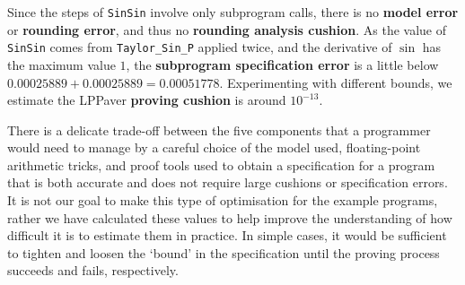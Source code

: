 \documentclass[runningheads]{llncs}
\begin{document}
Since the steps of \lstinline{SinSin} involve only subprogram calls, there is no \textbf{model error} or \textbf{rounding error}, and thus no \textbf{rounding analysis cushion}.
As the value of \lstinline{SinSin} comes from \lstinline{Taylor_Sin_P} applied twice, and the derivative of $\sin$ has the maximum value $1$, the \textbf{subprogram specification error} is a little below $0.00025889 + 0.00025889 = 0.00051778$.
Experimenting with different bounds, we estimate the 
LPPaver \textbf{proving cushion} is around $10^{-13}$.


There is a delicate trade-off between the five components that a programmer would need to manage by a careful choice of the model used, floating-point arithmetic tricks, and proof tools used to obtain a specification for a program that is both accurate and does not require large cushions or specification errors.
It is not our goal to make this type of optimisation for the example programs, rather we have calculated these values to help improve the understanding of how difficult it is to estimate them in practice.
In simple cases, it would be sufficient to tighten and loosen the `bound' in the specification until the proving process succeeds and fails, respectively.

% 
\end{document}

